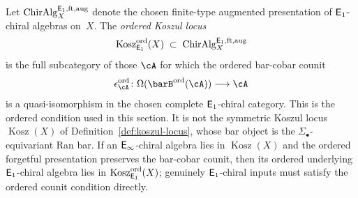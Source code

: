 \begin{definition}
\label{def:ordered-koszul-locus}
Let \(\operatorname{ChirAlg}^{\mathsf{E}_1,\mathrm{ft,aug}}_X\)
denote the chosen finite-type augmented presentation of
\(\mathsf{E}_1\)-chiral algebras on~\(X\). The \emph{ordered Koszul
locus}
\[
\operatorname{Kosz}^{\mathrm{ord}}_{\mathsf{E}_1}(X)
\;\subset\;
\operatorname{ChirAlg}^{\mathsf{E}_1,\mathrm{ft,aug}}_X
\]
is the full subcategory of those \(\cA\) for which the ordered
bar-cobar counit
\[
\epsilon^{\mathrm{ord}}_{\cA}\colon
\Omega(\barB^{\mathrm{ord}}(\cA))
\longrightarrow
\cA
\]
is a quasi-isomorphism in the chosen complete \(\mathsf{E}_1\)-chiral
category. This is the ordered condition used in this section.
It is not the symmetric Koszul locus
\(\operatorname{Kosz}(X)\) of
Definition~\textup{\ref{def:koszul-locus}}, whose bar object is the
\(\Sigma_\bullet\)-equivariant Ran bar. If an \(\mathsf{E}_{\infty}\)-chiral algebra
lies in \(\operatorname{Kosz}(X)\) and the ordered forgetful
presentation preserves the bar-cobar counit, then its ordered
underlying \(\mathsf{E}_1\)-chiral algebra lies in
\(\operatorname{Kosz}^{\mathrm{ord}}_{\mathsf{E}_1}(X)\); genuinely
\(\mathsf{E}_1\)-chiral inputs must satisfy the ordered counit condition
directly.
\end{definition}

